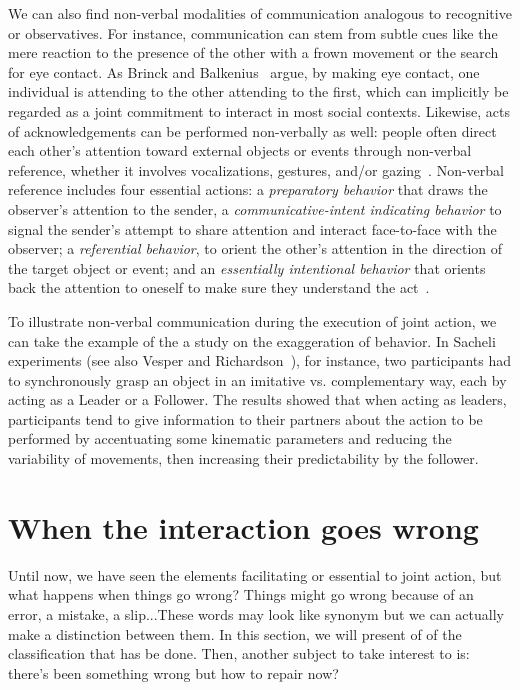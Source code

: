 \documentclass[a4paper,11pt,twoside]{StyleThese}
\begin{document}
We can also find non-verbal modalities of communication analogous to recognitive or observatives. For instance, communication can stem from subtle cues like the mere reaction to the presence of the other with a frown movement or the search for eye contact. As Brinck and Balkenius~\cite{brinck_2018_mutual} argue, by making eye contact, one individual is attending to the other attending to the first, which can implicitly be regarded as a joint commitment to interact in most social contexts. Likewise, acts of acknowledgements can be performed non-verbally as well: people often direct each other's attention toward external objects or events through non-verbal reference, whether it involves vocalizations, gestures, and/or gazing~\cite{bates_1979_emergence, leavens_2004_referential, brinck_2008_role}. Non-verbal reference includes four essential actions: a \textit{preparatory behavior} that draws the observer’s attention to the sender, a \textit{communicative-intent indicating behavior} to signal the sender’s attempt to share attention and interact face-to-face with the observer; a \textit{referential behavior}, to orient the other’s attention in the direction of the target object or event; and an \textit{essentially intentional behavior} that orients back the attention to oneself to make sure they understand the act~\cite[p.~122-123]{brinck_2008_role}.

To illustrate non-verbal communication during the execution of joint action, we can take the example of the a study on the exaggeration of behavior. In Sacheli \etal{} experiments (see also Vesper and Richardson~\cite{vesper_2014_strategic}), for instance, two participants had to synchronously grasp an object in an imitative vs. complementary way, each by acting as a Leader or a Follower. The results showed that when acting as leaders, participants tend to give information to their partners about the action to be performed by accentuating some kinematic parameters and reducing the variability of movements, then increasing their predictability by the follower. 


\section{When the interaction goes wrong}
Until now, we have seen the elements facilitating or essential to joint action, but what happens when things go wrong? Things might go wrong because of an error, a mistake, a slip...These words may look like synonym but we can actually make a distinction between them. In this section, we will present of of the classification that has be done. Then, another subject to take interest to is: there's been something wrong but how to repair now?
\end{document}
